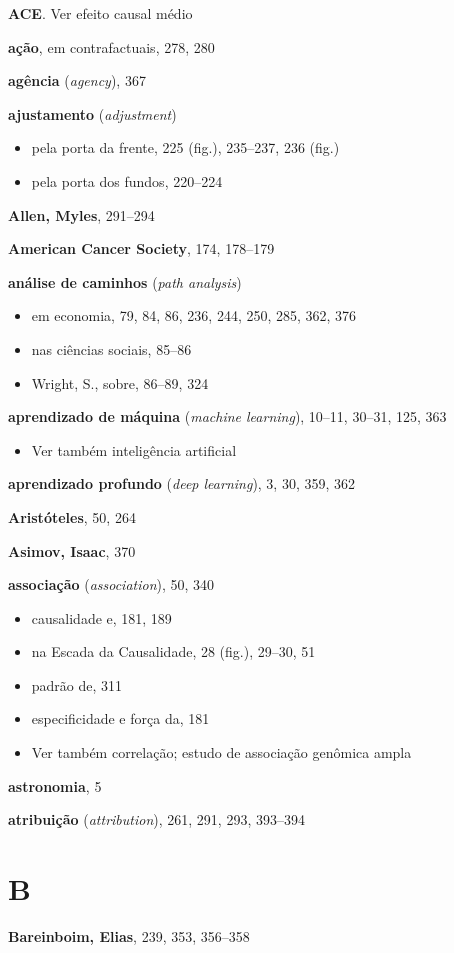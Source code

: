 \documentclass[11pt,a5paper,twoside]{book}
\begin{document}
\textbf{ACE}. Ver efeito causal médio

\textbf{ação}, em contrafactuais, 278, 280

\textbf{agência} (\textit{agency}), 367

\textbf{ajustamento} (\textit{adjustment})

\begin{itemize}
\item pela porta da frente, 225 (fig.), 235–237, 236 (fig.)
\item pela porta dos fundos, 220–224
\end{itemize}
\textbf{Allen, Myles}, 291–294

\textbf{American Cancer Society}, 174, 178–179

\textbf{análise de caminhos} (\textit{path analysis})

\begin{itemize}
\item em economia, 79, 84, 86, 236, 244, 250, 285, 362, 376
\item nas ciências sociais, 85–86
\item Wright, S., sobre, 86–89, 324
\end{itemize}
\textbf{aprendizado de máquina} (\textit{machine learning}), 10–11, 30–31, 125, 363

\begin{itemize}
\item Ver também inteligência artificial
\end{itemize}
\textbf{aprendizado profundo} (\textit{deep learning}), 3, 30, 359, 362

\textbf{Aristóteles}, 50, 264

\textbf{Asimov, Isaac}, 370

\textbf{associação} (\textit{association}), 50, 340

\begin{itemize}
\item causalidade e, 181, 189
\item na Escada da Causalidade, 28 (fig.), 29–30, 51
\item padrão de, 311
\item especificidade e força da, 181
\item Ver também correlação; estudo de associação genômica ampla
\end{itemize}
\textbf{astronomia}, 5

\textbf{atribuição} (\textit{attribution}), 261, 291, 293, 393–394

\section{B}
\textbf{Bareinboim, Elias}, 239, 353, 356–358
\end{document}
